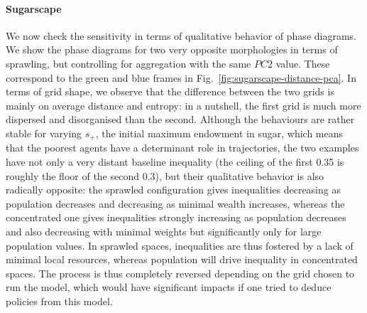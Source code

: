 \documentclass[3p,times,procedia]{elsarticle}
\begin{document}
\paragraph{Sugarscape} We now check the sensitivity in terms of qualitative behavior of phase diagrams. We show the phase diagrams for two very opposite morphologies in terms of sprawling, but controlling for aggregation with the same $PC2$ value. These correspond to the green and blue frames in Fig.~\ref{fig:sugarscape-distance-pca}. In terms of grid shape, we observe that the difference between the two grids is mainly on average distance and entropy: in a nutshell, the first grid is much more dispersed and disorganised than the second. Although the behaviours are rather stable for varying $s_+$, the initial maximum endowment in sugar, which means that the poorest agents have a determinant role in trajectories, the two examples have not only a very distant baseline inequality (the ceiling of the first 0.35 is roughly the floor of the second 0.3), but their qualitative behavior is also radically opposite: the sprawled configuration gives inequalities decreasing as population decreases and decreasing as minimal wealth increases, whereas the concentrated one gives inequalities strongly increasing as population decreases and also decreasing with minimal weights but significantly only for large population values. In sprawled spaces, inequalities are thus fostered by a lack of minimal local resources, whereas population will drive inequality in concentrated spaces. The process is thus completely reversed depending on the grid chosen to run the model, which would have significant impacts if one tried to deduce policies from this model.


\end{document}
